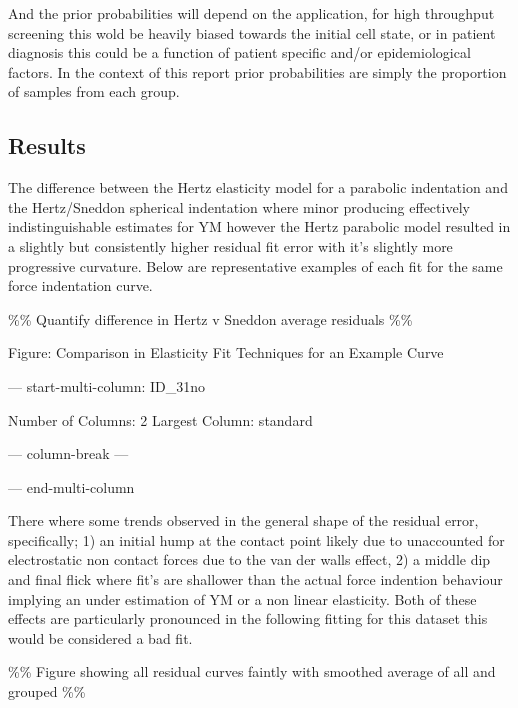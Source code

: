 \documentclass[
  paper=a4,
  ,captions=tableheading
]{scrartcl}
\newenvironment{Shaded}{}{}
\newcommand{\NormalTok}[1]{#1}
\begin{document}
And the prior probabilities will depend on the application, for high
throughput screening this wold be heavily biased towards the initial
cell state, or in patient diagnosis this could be a function of patient
specific and/or epidemiological factors. In the context of this report
prior probabilities are simply the proportion of samples from each
group.

\subsection{Results}\label{results}

The difference between the Hertz elasticity model for a parabolic
indentation and the Hertz/Sneddon spherical indentation where minor
producing effectively indistinguishable estimates for YM however the
Hertz parabolic model resulted in a slightly but consistently higher
residual fit error with it's slightly more progressive curvature. Below
are representative examples of each fit for the same force indentation
curve.

\%\% Quantify difference in Hertz v Sneddon average residuals \%\%

Figure: Comparison in Elasticity Fit Techniques for an Example Curve

--- start-multi-column: ID\_31no

\begin{Shaded}
\begin{Highlighting}[]
\NormalTok{Number of Columns: 2}
\NormalTok{Largest Column: standard}
\end{Highlighting}
\end{Shaded}

{}

--- column-break ---

{}

--- end-multi-column

There where some trends observed in the general shape of the residual
error, specifically; 1) an initial hump at the contact point likely due
to unaccounted for electrostatic non contact forces due to the van der
walls effect, 2) a middle dip and final flick where fit's are shallower
than the actual force indention behaviour implying an under estimation
of YM or a non linear elasticity. Both of these effects are particularly
pronounced in the following fitting for this dataset this would be
considered a bad fit.

{}

\%\% Figure showing all residual curves faintly with smoothed average of
all and grouped \%\%
\end{document}
